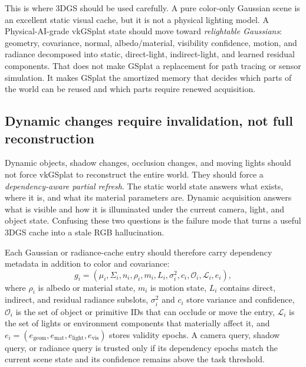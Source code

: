 \documentclass[10pt,journal,onecolumn]{IEEEtran}
\begin{document}
This is where 3DGS should be used carefully. A pure color-only Gaussian scene is
an excellent static visual cache, but it is not a physical lighting model. A
Physical-AI-grade vkGSplat state should move toward \emph{relightable Gaussians}:
geometry, covariance, normal, albedo/material, visibility confidence, motion,
and radiance decomposed into static, direct-light, indirect-light, and learned
residual components. That does not make GSplat a replacement for path tracing or
sensor simulation. It makes GSplat the amortized memory that decides which
parts of the world can be reused and which parts require renewed acquisition.

\subsection{Dynamic changes require invalidation, not full reconstruction}
\label{sec:dynamic-invalidation}

Dynamic objects, shadow changes, occlusion changes, and moving lights should not
force vkGSplat to reconstruct the entire world. They should force a
\emph{dependency-aware partial refresh}. The static world state answers what
exists, where it is, and what its material parameters are. Dynamic acquisition
answers what is visible and how it is illuminated under the current camera,
light, and object state. Confusing these two questions is the failure mode that
turns a useful 3DGS cache into a stale RGB hallucination.

Each Gaussian or radiance-cache entry should therefore carry dependency metadata
in addition to color and covariance:
\[
g_i =
(\mu_i,\Sigma_i,n_i,\rho_i,m_i,L_i,\sigma_i^2,c_i,
 \mathcal{O}_i,\mathcal{L}_i,e_i),
\]
where $\rho_i$ is albedo or material state, $m_i$ is motion state, $L_i$
contains direct, indirect, and residual radiance subslots, $\sigma_i^2$ and
$c_i$ store variance and confidence, $\mathcal{O}_i$ is the set of object or
primitive IDs that can occlude or move the entry, $\mathcal{L}_i$ is the set of
lights or environment components that materially affect it, and
$e_i=(e_{\mathrm{geom}},e_{\mathrm{mat}},e_{\mathrm{light}},e_{\mathrm{vis}})$
stores validity epochs. A camera query, shadow query, or radiance query is
trusted only if its dependency epochs match the current scene state and its
confidence remains above the task threshold.
\end{document}
